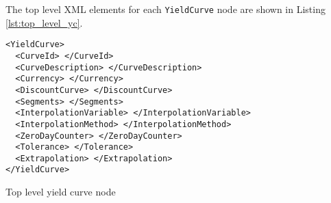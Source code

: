 The top level XML elements for each \lstinline!YieldCurve! node are shown in Listing \ref{lst:top_level_yc}.

\begin{listing}[H]
\begin{verbatim}
<YieldCurve>
  <CurveId> </CurveId>
  <CurveDescription> </CurveDescription>
  <Currency> </Currency>
  <DiscountCurve> </DiscountCurve>
  <Segments> </Segments>
  <InterpolationVariable> </InterpolationVariable>
  <InterpolationMethod> </InterpolationMethod>
  <ZeroDayCounter> </ZeroDayCounter>
  <Tolerance> </Tolerance>
  <Extrapolation> </Extrapolation>
</YieldCurve>
\end{verbatim}
\caption{Top level yield curve node}
\label{lst:top_level_yc}
\end{listing}

